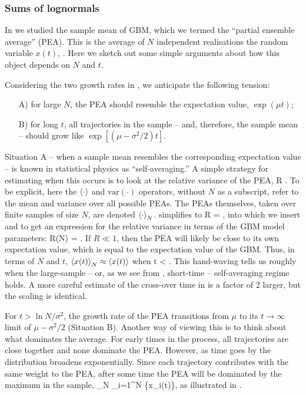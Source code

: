 \subsubsection{Sums of lognormals}
In \cite{PetersKlein2013} we studied the sample mean of GBM, which we termed the ``partial ensemble average'' (PEA). This is the average of $N$ independent realisations the random variable $x(t)$, . Here we sketch out some simple arguments about how this object depends on $N$ and $t$.

Considering the two growth rates in , we anticipate the following tension:
\begin{enumerate}
\item[A)] for large $N$, the PEA should resemble the expectation value, $\exp(\mu t)$;
\item[B)] for long $t$, all trajectories in the sample -- and, therefore, the sample mean -- should grow like $\exp[(\mu-\sigma^2/2)t]$.
\end{enumerate}
Situation A -- when a sample mean resembles the corresponding expectation value -- is known in statistical physics as ``self-averaging.'' A simple strategy for estimating when this occurs is to look at the relative variance of the PEA,
\be
R \equiv {}.
\ee
To be explicit, here the $\left\langle\cdot \right\rangle$ and $\text{var}(\cdot)$ operators, 
without $N$ as a subscript, 
refer to the mean and variance over all possible PEAs. The PEAs themselves, taken over finite samples of size $N$, are denoted $\left\langle\cdot \right\rangle_N$.  simplifies to
\be
R = ,
\ee
into which we insert  and  to get an expression for the relative variance in terms of the GBM model parameters:
\be
R(N) = .
\ee
If $R \ll 1$, then the PEA will likely be close to its own expectation value, which is equal to the expectation value of the GBM. Thus, in terms of $N$ and $t$, $\left\langle x(t) \right\rangle_N\approx\left\langle x(t) \right\rangle$ when
\be
t < .
\ee
This hand-waving tells us roughly when the large-sample -- or, as we see from , short-time -- self-averaging regime holds. A more careful estimate of the cross-over time in  is a factor of 2 larger, but the scaling is identical.

For $t>\ln N/\sigma^2$, the growth rate of the PEA transitions from $\mu$ to its $t\to\infty$ limit of $\mu-\sigma^2/2$ (Situation B). 
Another way of viewing this is to think about what dominates the average. For early times in the process, all trajectories are close together and none dominate the PEA. However, as time goes by the distribution broadens exponentially. Since each trajectory contributes with the same weight to the PEA, after some time the PEA will be dominated by the maximum in the sample,
\be
{}_N \approx {}\max_{i=1}^N \{x_i(t)\},
\ee
as illustrated in .

